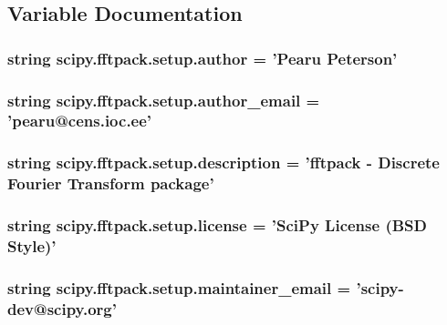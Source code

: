 \subsection{Variable Documentation}
\hypertarget{namespacescipy_1_1fftpack_1_1setup_a0b760ad3f7bb68077a93eb14353a919a}{}
\subsubsection[{author}]{\setlength{\rightskip}{0pt plus 5cm}string scipy.\+fftpack.\+setup.\+author = 'Pearu Peterson'}\label{namespacescipy_1_1fftpack_1_1setup_a0b760ad3f7bb68077a93eb14353a919a}
\hypertarget{namespacescipy_1_1fftpack_1_1setup_afdbdebfdeeb214f4a9eb896818850bf7}{}
\subsubsection[{author\+\_\+email}]{\setlength{\rightskip}{0pt plus 5cm}string scipy.\+fftpack.\+setup.\+author\+\_\+email = 'pearu@cens.\+ioc.\+ee'}\label{namespacescipy_1_1fftpack_1_1setup_afdbdebfdeeb214f4a9eb896818850bf7}
\hypertarget{namespacescipy_1_1fftpack_1_1setup_ade146845e0b460a463d0ebf5551fa990}{}
\subsubsection[{description}]{\setlength{\rightskip}{0pt plus 5cm}string scipy.\+fftpack.\+setup.\+description = 'fftpack -\/ Discrete Fourier Transform package'}\label{namespacescipy_1_1fftpack_1_1setup_ade146845e0b460a463d0ebf5551fa990}
\hypertarget{namespacescipy_1_1fftpack_1_1setup_a2ee7131189db7b5db4602f1e18be96a2}{}
\subsubsection[{license}]{\setlength{\rightskip}{0pt plus 5cm}string scipy.\+fftpack.\+setup.\+license = 'Sci\+Py License (B\+S\+D Style)'}\label{namespacescipy_1_1fftpack_1_1setup_a2ee7131189db7b5db4602f1e18be96a2}
\hypertarget{namespacescipy_1_1fftpack_1_1setup_aeee8004a47463846bb79573d80d17a99}{}
\subsubsection[{maintainer\+\_\+email}]{\setlength{\rightskip}{0pt plus 5cm}string scipy.\+fftpack.\+setup.\+maintainer\+\_\+email = 'scipy-\/dev@scipy.\+org'}\label{namespacescipy_1_1fftpack_1_1setup_aeee8004a47463846bb79573d80d17a99}
